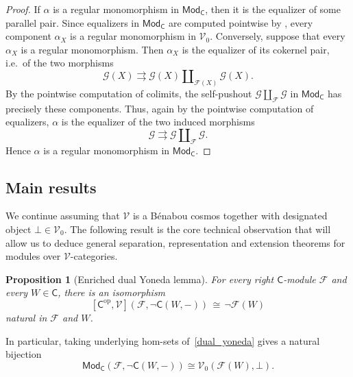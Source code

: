 \documentclass[11pt,onecolumn]{article}
\newcommand{\cV}{\mathscr{V}}
\newcommand{\cC}{\mathsf{C}}
\newcommand{\op}{\mathrm{op}}
\newcommand{\Mod}{\mathsf{Mod}}
\theoremstyle{plain}
\newtheorem{prop}[prop]{Proposition}
\theoremstyle{remark}
\theoremstyle{definition}
\begin{document}
\begin{proof}
	If $\alpha$ is a regular monomorphism in $\Mod_\cC$, then it is the equalizer of some parallel pair.
	Since equalizers in $\Mod_\cC$ are computed pointwise by , every component $\alpha_X$ is a regular monomorphism in $\cV_0$.
	Conversely, suppose that every $\alpha_X$ is a regular monomorphism.
	Then $\alpha_X$ is the equalizer of its cokernel pair, i.e.~of the two morphisms
	\[
		\mathcal{G}(X)
		\rightrightarrows
		\mathcal{G}(X) \amalg_{\mathcal{F}(X)} \mathcal{G}(X).
	\]
	By the pointwise computation of colimits, the self-pushout $\mathcal{G} \amalg_{\mathcal{F}} \mathcal{G}$ in $\Mod_\cC$ has precisely these components.
	Thus, again by the pointwise computation of equalizers, $\alpha$ is the equalizer of the two induced morphisms
	\[
		\mathcal{G}
		\rightrightarrows
		\mathcal{G} \amalg_{\mathcal{F}} \mathcal{G}.
	\]
	Hence $\alpha$ is a regular monomorphism in $\Mod_\cC$.
\end{proof}

\subsection{Main results}
\label{sec:main_results}

We continue assuming that $\cV$ is a B\'enabou cosmos together with designated object $\bot \in \cV_0$.
The following result is the core technical observation that will allow us to deduce general separation, representation and extension theorems for modules over $\cV$-categories.

\begin{prop}[Enriched dual Yoneda lemma]
	\label{prop:dual_yoneda_enriched}
	For every right $\cC$-module $\mathcal{F}$ and every $W \in \cC$, there is an isomorphism
	\begin{equation}
		\label{dual_yoneda}
		[\cC^\op,\cV](\mathcal{F}, \neg \cC(W,-))
		\,\cong\,
		\neg \mathcal{F}(W)
	\end{equation}
	natural in $\mathcal{F}$ and $W$.
\end{prop}

In particular, taking underlying hom-sets of~\eqref{dual_yoneda} gives a natural bijection
\begin{equation}
	\label{dual_yoneda_set}
	\Mod_\cC(\mathcal{F}, \neg \cC(W, -)) \cong \cV_0(\mathcal{F}(W), \bot).
\end{equation}
\end{document}
